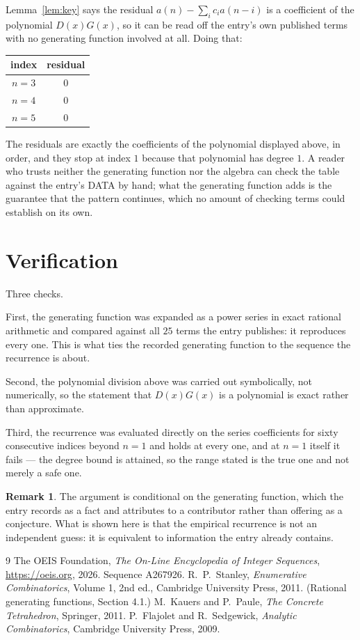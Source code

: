 \documentclass[11pt,a4paper]{article}
\theoremstyle{plain}
\theoremstyle{definition}
\newtheorem{remark}[theorem]{Remark}
\begin{document}
Lemma~\ref{lem:key} says the residual $a(n)-\sum_ic_ia(n-i)$ is a coefficient of the
polynomial $D(x)G(x)$, so it can be read off the entry's own published terms with no
generating function involved at all. Doing that:
\begin{center}
\begin{tabular}{cc}
index & residual \\ \hline
$n=3$ & $0$ \\
$n=4$ & $0$ \\
$n=5$ & $0$
\end{tabular}
\end{center}
The residuals are exactly the coefficients of the polynomial displayed above, in order, and
they stop at index $1$ because that polynomial has degree $1$. A reader who trusts
neither the generating function nor the algebra can check the table against the entry's DATA
by hand; what the generating function adds is the guarantee that the pattern continues, which
no amount of checking terms could establish on its own.

\section{Verification}

Three checks.

First, the generating function was expanded as a power series in exact rational arithmetic and
compared against all $25$ terms the entry publishes: it reproduces every one. This is
what ties the recorded generating function to the sequence the recurrence is about.

Second, the polynomial division above was carried out symbolically, not numerically, so the
statement that $D(x)G(x)$ is a polynomial is exact rather than approximate.

Third, the recurrence was evaluated directly on the series coefficients for sixty consecutive
indices beyond $n=1$ and holds at every one, and at $n=1$ itself it fails --- the
degree bound is attained, so the range stated is the true one and not merely a safe one.

\begin{remark}
The argument is conditional on the generating function, which the entry records as a fact and
attributes to a contributor rather than offering as a conjecture. What is shown here is that
the empirical recurrence is not an independent guess: it is equivalent to information the
entry already contains.
\end{remark}

\begin{thebibliography}{9}
 The OEIS Foundation, \emph{The On-Line Encyclopedia of Integer
Sequences}, \url{https://oeis.org}, 2026. Sequence A267926.
 R.~P.~Stanley, \emph{Enumerative Combinatorics}, Volume 1, 2nd ed.,
Cambridge University Press, 2011. (Rational generating functions, Section 4.1.)
 M.~Kauers and P.~Paule, \emph{The Concrete Tetrahedron}, Springer, 2011.
 P.~Flajolet and R.~Sedgewick, \emph{Analytic Combinatorics}, Cambridge
University Press, 2009.
\end{thebibliography}
\end{document}
